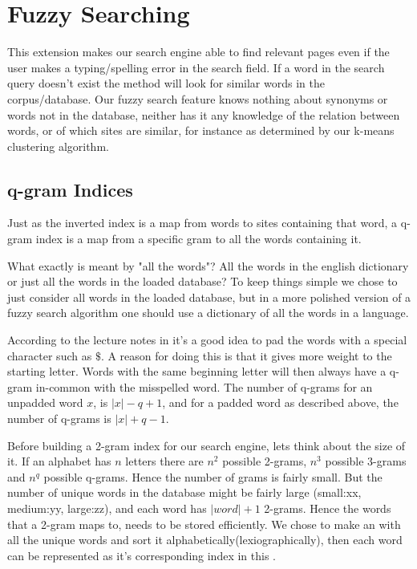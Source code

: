 \section{Fuzzy Searching}
This extension makes our search engine able to find relevant pages even if the user makes a typing/spelling error in the search field. If a word in the search query doesn't exist the  method will look for similar words in the corpus/database. 
Our fuzzy search feature knows nothing about synonyms or words not in the database, neither has it any knowledge of the relation between words, or of which sites are similar, for instance as determined by our k-means clustering algorithm.  


\subsection{q-gram Indices}
Just as the inverted index is a map from words to sites containing that word, a q-gram index is a map from a specific gram to all the words containing it. 

What exactly is meant by "all the words"? All the words in the english dictionary or just all the words in the loaded database? To keep things simple we chose to just consider all words in the loaded database, but in a more polished version of a fuzzy search algorithm one should use a dictionary of all the words in a language. 

According to the lecture notes in \cite{lectureNotes} it's a good idea to pad the words with a special character such as \(\$\). A reason for doing this is that it gives more weight to the starting letter. Words with the same beginning letter will then always have a q-gram in-common with the misspelled word. 
The number of q-grams for an unpadded word \(x\), is \(|x| - q + 1\), and for a padded word as described above, the number of q-grams is \(|x| + q - 1\).  

Before building a 2-gram index for our search engine, lets think about the size of it.
If an alphabet has \(n\) letters there are \(n^2\) possible 2-grams, \(n^3\) possible 3-grams and \(n^q\) possible q-grams. Hence the number of grams is fairly small. But the number of unique words in the database might be fairly large (small:xx, medium:yy, large:zz), and each word has \(|word| + 1\) 2-grams. Hence the words that a 2-gram maps to, needs to be stored efficiently. 
We chose to make an  with all the unique words and sort it alphabetically(lexiographically), then each word can be represented as it's corresponding index in this .

